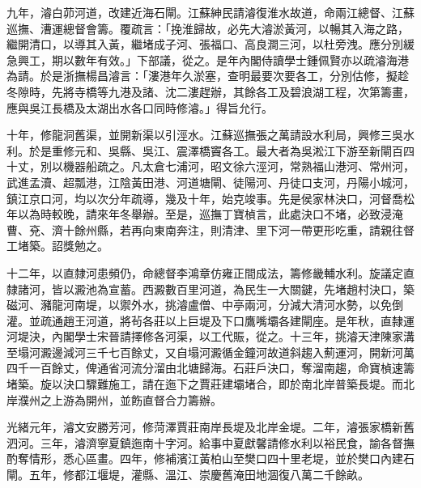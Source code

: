 \begin{pinyinscope}
九年，濬白茆河道，改建近海石閘。江蘇紳民請濬復淮水故道，命兩江總督、江蘇巡撫、漕運總督會籌。覆疏言：「挽淮歸故，必先大濬淤黃河，以暢其入海之路，繼開清口，以導其入黃，繼堵成子河、張福口、高良澗三河，以杜旁洩。應分別緩急興工，期以數年有效。」下部議，從之。是年內閣侍讀學士鍾佩賢亦以疏濬海港為請。於是浙撫楊昌濬言：「漊港年久淤塞，查明最要次要各工，分別估修，擬趁冬隙時，先將寺橋等九港及諸、沈二漊趕辦，其餘各工及碧浪湖工程，次第籌畫，應與吳江長橋及太湖出水各口同時修濬。」得旨允行。

十年，修龍洞舊渠，並開新渠以引涇水。江蘇巡撫張之萬請設水利局，興修三吳水利。於是重修元和、吳縣、吳江、震澤橋竇各工。最大者為吳淞江下游至新閘百四十丈，別以機器船疏之。凡太倉七浦河，昭文徐六涇河，常熟福山港河、常州河，武進孟瀆、超瓢港，江陰黃田港、河道塘閘、徒陽河、丹徒口支河，丹陽小城河，鎮江京口河，均以次分年疏導，幾及十年，始克竣事。先是侯家林決口，河督喬松年以為時較晚，請來年冬舉辦。至是，巡撫丁寶楨言，此處決口不堵，必致浸淹曹、兗、濟十餘州縣，若再向東南奔注，則清津、里下河一帶更形吃重，請親往督工堵築。詔獎勉之。

十二年，以直隸河患頻仍，命總督李鴻章仿雍正間成法，籌修畿輔水利。旋議定直隸諸河，皆以澱池為宣蓄。西澱數百里河道，為民生一大關鍵，先堵趙村決口，築磁河、瀦龍河南堤，以禦外水，挑濬盧僧、中亭兩河，分減大清河水勢，以免倒灌。並疏通趙王河道，將茍各莊以上巨堤及下口鷹嘴壩各建閘座。是年秋，直隸運河堤決，內閣學士宋晉請擇修各河渠，以工代賑，從之。十三年，挑濬天津陳家溝至塌河澱邊減河三千七百餘丈，又自塌河澱循金鐘河故道斜趨入薊運河，開新河萬四千一百餘丈，俾通省河流分溜由北塘歸海。石莊戶決口，奪溜南趨，命寶楨速籌堵築。旋以決口驟難施工，請在迤下之賈莊建壩堵合，即於南北岸普築長堤。而北岸濮州之上游為開州，並飭直督合力籌辦。

光緒元年，濬文安勝芳河，修菏澤賈莊南岸長堤及北岸金堤。二年，濬張家橋新舊泗河。三年，濬濟寧夏鎮迤南十字河。給事中夏獻馨請修水利以裕民食，諭各督撫酌奪情形，悉心區畫。四年，修補濱江黃柏山至樊口四十里老堤，並於樊口內建石閘。五年，修都江堰堤，灌縣、溫江、崇慶舊淹田地涸復八萬二千餘畝。


\end{pinyinscope}
